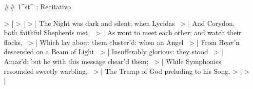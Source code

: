 ## 1^st^ \mvmt: Recitativo

> | \beginnumbering
> | \pstart
> | The Night was dark and silent; when Lycidas \
> | And Corydon, both faithful Shepherds met, \
> | As wont to meet each other; and watch their flocks, \
> | Which lay about them cluster’d: when an Angel \
> | From Heav’n descended on a Beam of Light \
> | Insufferably glorious: they stood \
> | Amaz’d: but he with this message chear’d them; \
> | While Symphonies resounded sweetly warbling, \
> | The Trump of God preluding to his Song.
> | \pend
> | \endnumbering
